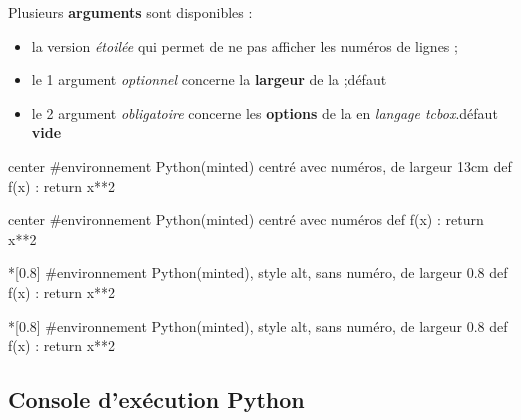 \documentclass[a4paper,french,11pt]{article}
\newcommand\ctex[1]{\tcbox[vignettelatex]{#1}}
\newcommand\Cle[1]{{\bfseries\sffamily\textlangle #1\textrangle}}
\begin{document}
\begin{codecles}
Plusieurs \Cle{arguments} sont disponibles :

\begin{itemize}
	\item la version \textit{étoilée} qui permet de ne pas afficher les numéros de lignes ;
	\item le 1 argument \textit{optionnel} concerne la \Cle{largeur} de la \ctex{tcbox} ;\hfill{}défaut \Cle{12cm}
	\item le 2 argument \textit{obligatoire} concerne les \Cle{options} de la \ctex{tcbox} en \textit{langage tcbox}.\hfill{}défaut \Cle{vide}
\end{itemize}
\end{codecles}

\begin{codetex}
\begin{CodePythonMinted}[13cm]{center}
	#environnement Python(minted) centré avec numéros, de largeur 13cm
	def f(x) :
		return x**2
\end{CodePythonMinted}
\end{codetex}

\begin{codesortie}
\begin{CodePythonMinted}[13cm]{center}
	#environnement Python(minted) centré avec numéros
	def f(x) :
		return x**2
\end{CodePythonMinted}
\end{codesortie}

\begin{codetex}
\begin{CodePythonMintedAlt}*[0.8\linewidth]{}
	#environnement Python(minted), style alt, sans numéro, de largeur 0.8\linewidth
	def f(x) :
		return x**2
\end{CodePythonMintedAlt}
\end{codetex}

\begin{codesortie}
\begin{CodePythonMintedAlt}*[0.8\linewidth]{}
	#environnement Python(minted), style alt, sans numéro, de largeur 0.8\linewidth
	def f(x) :
		return x**2
\end{CodePythonMintedAlt}
\end{codesortie}

\subsection{Console d'exécution Python}
\end{document}
